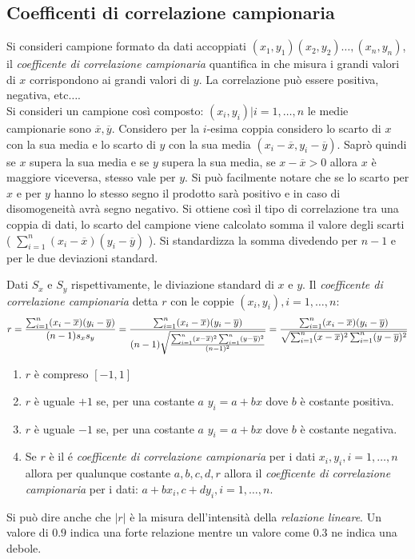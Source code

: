 \documentclass{article}
\begin{document}
\hfill

\subsection*{Coefficenti di correlazione campionaria}

Si consideri campione formato da dati accoppiati $(x_1,y_1)(x_2,y_2)\dots,(x_n,y_n)$, il \textit{coefficente di correlazione campionaria} quantifica in che misura i grandi valori di $x$ corrispondono ai grandi valori di $y$.  La correlazione può essere positiva, negativa, etc$\dots$. \\
Si consideri un campione così composto: $(x_i,y_i)| i=1,\dots,n$ le medie campionarie sono $\overline{x}, \overline{y}$. Considero per la $i$-esima coppia considero lo scarto di $x$ con la sua media e lo scarto di $y$ con la sua media $(x_i-\overline{x}, y_i-\overline{y})$. Saprò quindi se $x$ supera la sua media e se $y$ supera la sua media, se $x - \overline{x} > 0$ allora $x$ è maggiore viceversa, stesso vale per $y$. Si può facilmente notare che se lo scarto per $x$ e per $y$ hanno lo stesso segno il prodotto sarà positivo e in caso di disomogeneità avrà segno negativo. Si ottiene così il tipo di correlazione tra una coppia di dati, lo scarto del campione viene calcolato somma il valore degli scarti ( $\sum_{i=1}^n(x_i-\overline{x})(y_i-\overline{y})$ ). Si standardizza la somma divedendo per $n-1$ e per le due deviazioni standard. 

\begin{tcolorbox}
  Dati $S_x$ e $S_y$ rispettivamente, le diviazione standard di $x$ e $y$. Il \textit{coefficente di correlazione campionaria} detta $r$ con le coppie $(x_i,y_i),i=1,\dots,n$: $$r=\frac{\sum_{i=1}^n(x_i-\overline{x})(y_i-\overline{y})}{(n-1)s_xs_y}= \\ \frac{
\sum_{i=1}^n(x_i-\overline{x})(y_i-\overline{y})}{(n-1)\sqrt{\frac{\sum_{i=1}^n(x-\overline{x})^2 \sum_{i=1}^n(y-\overline{y})^2}{(n-1)^2}  }}= \frac{
\sum_{i=1}^n(x_i-\overline{x})(y_i-\overline{y})}{\sqrt{\sum_{i=1}^n(x-\overline{x})^2 \sum_{i=1}^n(y-\overline{y})^2}}$$ 


\begin{enumerate}
  \item $r$ è compreso $[-1,1]$ 
  \item $r$ è uguale $+1$ se, per una costante $a$ $y_i=a+bx$ dove $b$ è costante positiva.
  \item $r$ è uguale $-1$ se, per una costante $a$ $y_i=a+bx$ dove $b$ è costante negativa.
  \item Se $r$ è il é \textit{coefficente di correlazione campionaria} per i dati $x_i,y_i, i=1,\dots,n$ allora per qualunque costante $a,b,c,d,r$ allora il \textit{coefficente di correlazione campionaria} per i dati: $a+bx_i,c+dy_i, i=1,\dots,n$. 

\end{enumerate}

Si può dire anche che $|r|$ è la misura dell'intensità della \textit{relazione lineare}. Un valore di $0.9$ indica una forte relazione mentre un valore come $0.3$ ne indica una debole. 



\end{tcolorbox}
\end{document}
